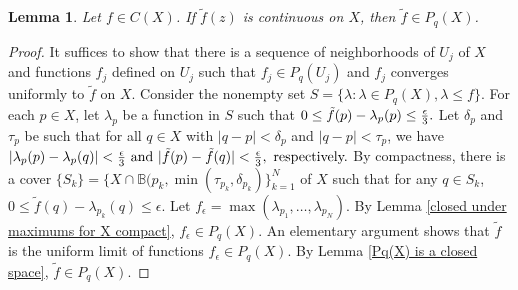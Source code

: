 \documentclass[12pt]{amsart}
\newtheorem{lem}[theorem]{Lemma}
\numberwithin{equation}{section}
{\theoremstyle{definition}
\newtheorem{remark}[theorem]{Remark}
}
\begin{document}
\begin{lem} \label{tilde in Pq}
Let $f \in C(X)$.   If
$\tilde{f}(z)$
is continuous on $X$, then $\tilde{f} \in P_q(X)$.
 \end{lem}
\begin{proof}
    It suffices to show that there is a sequence of neighborhoods of $U_j$ of $X$ and functions $f_j$ defined on $U_j$ such that $f_j \in P_q(U_j)$ and $f_j$ converges uniformly to $\tilde{f}$ on $X$.  Consider the nonempty set
    $
    S = \{\lambda: \lambda \in P_q(X), \lambda \leq f\}.
    $
    For each $p \in X$, let $\lambda_p$ be a function in $S$ such that
    $
    0 \leq \tilde{f}(p) - \lambda_p(p) \leq {\epsilon \over 3}.
    $
    Let $\delta_p$ and $\tau_p$ be such that for all $q \in X$ with $|q - p| < \delta_p$ and $|q - p| < \tau_p$, we have
    $
    |\lambda_p(p) - \lambda_p(q)| < {\epsilon \over 3} \hbox{ and } 
    |\tilde{f}(p) - \tilde{f}(q)| < {\epsilon \over 3}, \hbox{ respectively.}
    $
    By compactness, there is a cover $\{S_k\} = \{X \cap \mathbb{B}(p_k, \min(\tau_{p_k}, \delta_{p_k})\}_{k =1}^N$ of $X$ such that for any $q \in S_k$,
    $
    0 \leq \tilde{f}(q) - \lambda_{p_k}(q) \leq \epsilon.
    $ Let $f_{\epsilon} = \max(\lambda_{p_1},\ldots,\lambda_{p_N})$. By Lemma \ref{closed under maximums for X compact}, $f_{\epsilon} \in P_q(X)$.  An elementary argument shows that $\tilde{f}$ is the uniform limit of functions $f_{\epsilon} \in P_q(X)$. By Lemma \ref{Pq(X) is a closed space}, $\tilde{f} \in P_q(X)$.
\end{proof}
\end{document}
